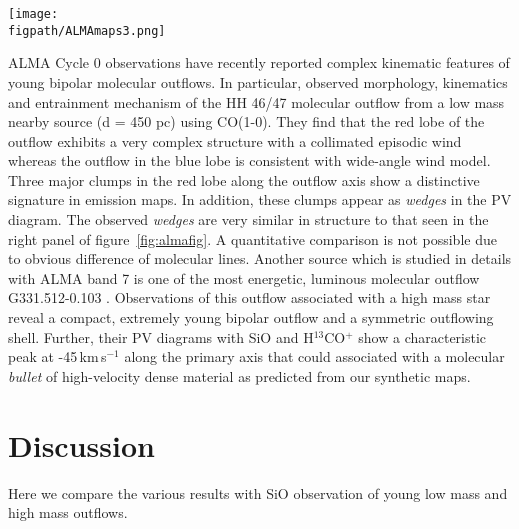 \documentclass[useAMS,usenatbib]{mn2e}
\newcommand{\figpath}{PFIGS/}
\begin{document}
\begin{figure*}
 \texttt{[image: \\figpath/ALMAmaps3.png]}
 \caption{{\bf Left:} The integrated intensity map of the three SiO lines simulated. The heat map shows the 5-4 line intensity (in units of Jy$\,$kms$^{-1}$/beam), the blue contours show the J=8-7 line intensity and the green contours show the J=2-1 line intensity. {\bf Right:} The PV diagram taken along the axis of the jet (in units of Jy/beam), showing the higher J transitions highlighting the knots of the jet and broad emission at the bow shock. In both panels the ticks on the color bar represent the contour levels, the levels not shown on the integrated intensity color bar are double the previous level.}
\label{fig:almafig}
\end{figure*} 

ALMA Cycle 0 observations have recently reported complex kinematic
features of young bipolar molecular outflows. In particular,
\cite{Arce:2013p14902} observed morphology, kinematics and entrainment
mechanism of the HH 46/47 molecular outflow from a low mass nearby
source (d = 450 pc) using CO(1-0). They find that the red
lobe of the outflow exhibits a very complex structure with a
collimated episodic wind whereas the outflow in the blue lobe is consistent with
wide-angle wind model. Three major clumps in the red lobe along the
outflow axis show a distinctive signature in emission maps. In
addition, these clumps appear as {\em{wedges}} in the PV
diagram. The observed {\em{wedges}} are very similar in structure to that 
seen in the right panel of figure~\ref{fig:almafig}. A quantitative
comparison is not possible due to obvious difference of molecular
lines. Another source which is studied in details with ALMA band 7 is
one of the most energetic, luminous molecular outflow
G331.512-0.103 \cite{Merello:2013p15066}. Observations of this outflow
associated with a high mass star reveal a compact, extremely young
bipolar outflow and a symmetric outflowing shell. Further, their PV
diagrams with SiO and H$^{13}$CO$^{+}$ show a characteristic peak at
-45\,km\,s$^{-1}$ along the primary axis that could associated with a 
molecular {\em bullet} of high-velocity dense material as predicted from our
synthetic maps.

 
\section{Discussion}
\label{sec:discussion}
Here we compare the various results with SiO observation of young low
mass and high mass outflows.
\end{document}
